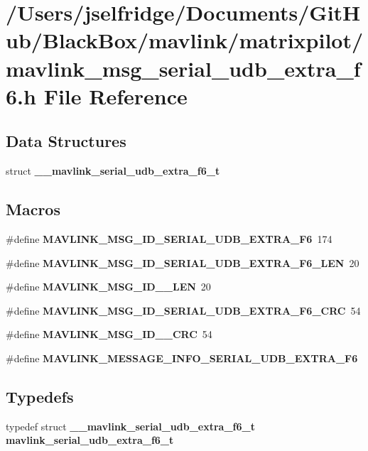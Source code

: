 \section{/\+Users/jselfridge/\+Documents/\+Git\+Hub/\+Black\+Box/mavlink/matrixpilot/mavlink\+\_\+msg\+\_\+serial\+\_\+udb\+\_\+extra\+\_\+f6.h File Reference}
\label{mavlink__msg__serial__udb__extra__f6_8h}
\subsection*{Data Structures}
\begin{DoxyCompactItemize}
\item 
struct \textbf{ \+\_\+\+\_\+mavlink\+\_\+serial\+\_\+udb\+\_\+extra\+\_\+f6\+\_\+t}
\end{DoxyCompactItemize}
\subsection*{Macros}
\begin{DoxyCompactItemize}
\item 
\#define \textbf{ M\+A\+V\+L\+I\+N\+K\+\_\+\+M\+S\+G\+\_\+\+I\+D\+\_\+\+S\+E\+R\+I\+A\+L\+\_\+\+U\+D\+B\+\_\+\+E\+X\+T\+R\+A\+\_\+\+F6}~174
\item 
\#define \textbf{ M\+A\+V\+L\+I\+N\+K\+\_\+\+M\+S\+G\+\_\+\+I\+D\+\_\+\+S\+E\+R\+I\+A\+L\+\_\+\+U\+D\+B\+\_\+\+E\+X\+T\+R\+A\+\_\+\+F6\+\_\+\+L\+EN}~20
\item 
\#define \textbf{ M\+A\+V\+L\+I\+N\+K\+\_\+\+M\+S\+G\+\_\+\+I\+D\+\_\+\_\+\+L\+EN}~20
\item 
\#define \textbf{ M\+A\+V\+L\+I\+N\+K\+\_\+\+M\+S\+G\+\_\+\+I\+D\+\_\+\+S\+E\+R\+I\+A\+L\+\_\+\+U\+D\+B\+\_\+\+E\+X\+T\+R\+A\+\_\+\+F6\+\_\+\+C\+RC}~54
\item 
\#define \textbf{ M\+A\+V\+L\+I\+N\+K\+\_\+\+M\+S\+G\+\_\+\+I\+D\+\_\+\_\+\+C\+RC}~54
\item 
\#define \textbf{ M\+A\+V\+L\+I\+N\+K\+\_\+\+M\+E\+S\+S\+A\+G\+E\+\_\+\+I\+N\+F\+O\+\_\+\+S\+E\+R\+I\+A\+L\+\_\+\+U\+D\+B\+\_\+\+E\+X\+T\+R\+A\+\_\+\+F6}
\end{DoxyCompactItemize}
\subsection*{Typedefs}
\begin{DoxyCompactItemize}
\item 
typedef struct \textbf{ \+\_\+\+\_\+mavlink\+\_\+serial\+\_\+udb\+\_\+extra\+\_\+f6\+\_\+t} \textbf{ mavlink\+\_\+serial\+\_\+udb\+\_\+extra\+\_\+f6\+\_\+t}
\end{DoxyCompactItemize}


